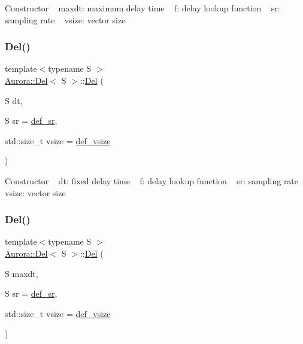 Constructor ~\newline
maxdt\+: maximum delay time ~\newline
f\+: delay lookup function ~\newline
sr\+: sampling rate ~\newline
vsize\+: vector size \mbox{\label{class_aurora_1_1_del_ae7ee559e909a215a6d8248d9c9a0ced8}} 
\subsubsection{\texorpdfstring{Del()}{Del()}\hspace{0.1cm}{\footnotesize\ttfamily [2/3]}}
{\footnotesize\ttfamily template$<$typename S $>$ \\
\hyperlink{class_aurora_1_1_del}{Aurora\+::\+Del}$<$ S $>$\+::\hyperlink{class_aurora_1_1_del}{Del} (\begin{DoxyParamCaption}\item[{S}]{dt,  }\item[{S}]{sr = {\ttfamily \hyperlink{namespace_aurora_ad49263d809bea98dd422e95bc91bc03e}{def\+\_\+sr}},  }\item[{std\+::size\+\_\+t}]{vsize = {\ttfamily \hyperlink{namespace_aurora_afaaddf667a06e7ce23c667a8b7295263}{def\+\_\+vsize}} }\end{DoxyParamCaption})\hspace{0.3cm}{\ttfamily [inline]}}

Constructor ~\newline
dt\+: fixed delay time ~\newline
f\+: delay lookup function ~\newline
sr\+: sampling rate ~\newline
vsize\+: vector size \mbox{\label{class_aurora_1_1_del_ab5fe2f7cee0b896f2d12932bb72fd925}} 
\subsubsection{\texorpdfstring{Del()}{Del()}\hspace{0.1cm}{\footnotesize\ttfamily [3/3]}}
{\footnotesize\ttfamily template$<$typename S $>$ \\
\hyperlink{class_aurora_1_1_del}{Aurora\+::\+Del}$<$ S $>$\+::\hyperlink{class_aurora_1_1_del}{Del} (\begin{DoxyParamCaption}\item[{S}]{maxdt,  }\item[{S}]{sr = {\ttfamily \hyperlink{namespace_aurora_ad49263d809bea98dd422e95bc91bc03e}{def\+\_\+sr}},  }\item[{std\+::size\+\_\+t}]{vsize = {\ttfamily \hyperlink{namespace_aurora_afaaddf667a06e7ce23c667a8b7295263}{def\+\_\+vsize}} }\end{DoxyParamCaption})\hspace{0.3cm}{\ttfamily [inline]}}


